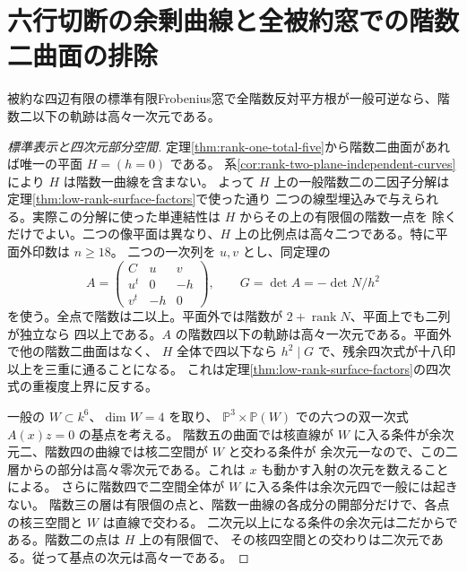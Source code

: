 \section{六行切断の余剰曲線と全被約窓での階数二曲面の排除}
\label{sec:rank-two-surface-excess-curves}
\begin{theorem}\label{thm:rank-two-surface-excess-curves}
被約な四辺有限の標準有限Frobenius窓で全階数反対平方根が一般可逆なら、階数二以下の軌跡は高々一次元である。
\end{theorem}
\begin{proof}[標準表示と四次元部分空間]
定理\ref{thm:rank-one-total-five}から階数二曲面があれば唯一の平面 $H=(h=0)$ である。
系\ref{cor:rank-two-plane-independent-curves}により $H$ は階数一曲線を含まない。
よって $H$ 上の一般階数二の二因子分解は定理\ref{thm:low-rank-surface-factors}で使った通り
二つの線型埋込みで与えられる。実際この分解に使った単連結性は $H$ からその上の有限個の階数一点を
除くだけでよい。二つの像平面は異なり、$H$ 上の比例点は高々二つである。特に平面外印数は $n\ge18$。
二つの一次列を $u,v$ とし、同定理の
\[
 A=\begin{pmatrix} C&u&v\\ u^t&0&-h\\ v^t&-h&0\end{pmatrix},
 \qquad G=\det A=-\det N/h^2
\]
を使う。全点で階数は二以上。平面外では階数が $2+\operatorname{rank}N$、平面上でも二列が独立なら
四以上である。$A$ の階数四以下の軌跡は高々一次元である。平面外で他の階数二曲面はなく、
$H$ 全体で四以下なら $h^2\mid G$ で、残余四次式が十八印以上を三重に通ることになる。
これは定理\ref{thm:low-rank-surface-factors}の四次式の重複度上界に反する。

一般の $W\subset k^6$、$\dim W=4$ を取り、
$\mathbb P^3\times\mathbb P(W)$ での六つの双一次式 $A(x)z=0$ の基点を考える。
階数五の曲面では核直線が $W$ に入る条件が余次元二、階数四の曲線では核二空間が $W$ と交わる条件が
余次元一なので、この二層からの部分は高々零次元である。これは $x$ も動かす入射の次元を数えることによる。
さらに階数四で二空間全体が $W$ に入る条件は余次元四で一般には起きない。
階数三の層は有限個の点と、階数一曲線の各成分の開部分だけで、各点の核三空間と $W$ は直線で交わる。
二次元以上になる条件の余次元は二だからである。階数二の点は $H$ 上の有限個で、
その核四空間との交わりは二次元である。従って基点の次元は高々一である。
\end{proof}
